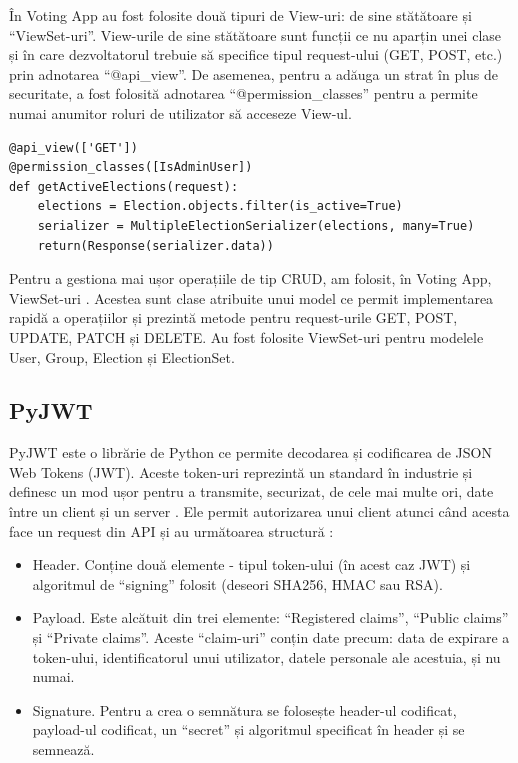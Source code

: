 În Voting App au fost folosite două tipuri de View-uri: de sine stătătoare și \enquote{ViewSet-uri}. View-urile de sine stătătoare sunt funcții ce nu aparțin unei clase și în care dezvoltatorul trebuie să specifice tipul request-ului (GET, POST, etc.) prin adnotarea \enquote{@api\_view}. De asemenea, pentru a adăuga un strat în plus de securitate, a fost folosită adnotarea \enquote{@permission\_classes} pentru a permite numai anumitor roluri de utilizator să acceseze View-ul.

\begin{code}
\begin{verbatim}
@api_view(['GET'])
@permission_classes([IsAdminUser])
def getActiveElections(request):
    elections = Election.objects.filter(is_active=True)
    serializer = MultipleElectionSerializer(elections, many=True)
    return(Response(serializer.data))
\end{verbatim}
\label{code:view-code}
\end{code}
\hfill

Pentru a gestiona mai ușor operațiile de tip CRUD, am folosit, în Voting App, ViewSet-uri \cite{what_is_viewset}. Acestea sunt clase atribuite unui model ce permit implementarea rapidă a operațiilor și prezintă metode pentru request-urile GET, POST, UPDATE, PATCH și DELETE. Au fost folosite ViewSet-uri pentru modelele User, Group, Election și ElectionSet.

\subsection{PyJWT}

PyJWT este o librărie de Python ce permite decodarea și codificarea de JSON Web Tokens (JWT). Aceste token-uri reprezintă un standard în industrie și definesc un mod ușor pentru a transmite, securizat, de cele mai multe ori, date între un client și un server \cite{what_is_pyjwt}. Ele permit autorizarea unui client atunci când acesta face un request din API și au următoarea structură \cite{what_is_jwt}:

\begin{itemize}
    \item Header. Conține două elemente - tipul token-ului (în acest caz JWT) și algoritmul de \enquote{signing} folosit (deseori SHA256, HMAC sau RSA).
    \item Payload. Este alcătuit din trei elemente: \enquote{Registered claims}, \enquote{Public claims} și \enquote{Private claims}. Aceste \enquote{claim-uri} conțin date precum: data de expirare a token-ului, identificatorul unui utilizator, datele personale ale acestuia, și nu numai. 
    \item Signature. Pentru a crea o semnătura se folosește header-ul codificat, payload-ul codificat, un \enquote{secret} și algoritmul specificat în header și se semnează.
\end{itemize}

